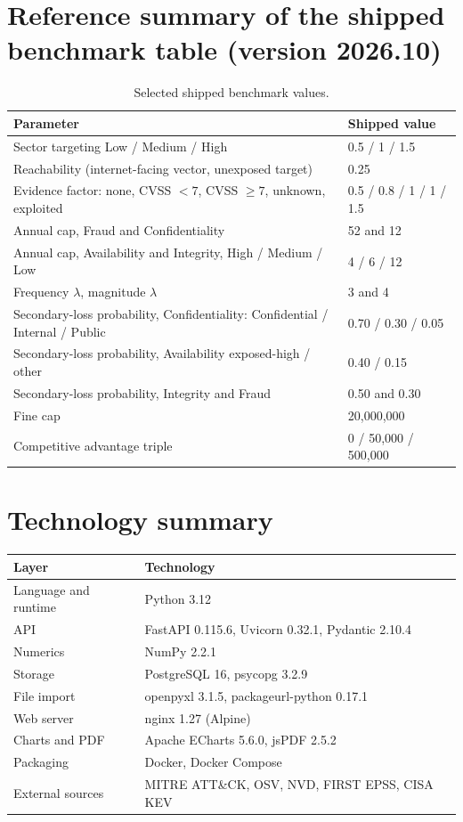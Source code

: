 \documentclass[11pt,a4paper]{article}
\begin{document}
\section{Reference summary of the shipped benchmark table (version 2026.10)}
\begin{table}[h]
\centering
\caption{Selected shipped benchmark values.}
\begin{tabularx}{\textwidth}{@{}l Y@{}}
\toprule
Parameter & Shipped value \\
\midrule
Sector targeting Low / Medium / High & 0.5 / 1 / 1.5 \\
Reachability (internet-facing vector, unexposed target) & 0.25 \\
Evidence factor: none, CVSS $<7$, CVSS $\ge7$, unknown, exploited & 0.5 / 0.8 / 1 / 1 / 1.5 \\
Annual cap, Fraud and Confidentiality & 52 and 12 \\
Annual cap, Availability and Integrity, High / Medium / Low & 4 / 6 / 12 \\
Frequency $\lambda$, magnitude $\lambda$ & 3 and 4 \\
Secondary-loss probability, Confidentiality: Confidential / Internal / Public & 0.70 / 0.30 / 0.05 \\
Secondary-loss probability, Availability exposed-high / other & 0.40 / 0.15 \\
Secondary-loss probability, Integrity and Fraud & 0.50 and 0.30 \\
Fine cap & 20,000,000 \\
Competitive advantage triple & 0 / 50,000 / 500,000 \\
\bottomrule
\end{tabularx}
\end{table}

\section{Technology summary}
\begin{center}
\begin{tabular}{@{}ll@{}}
\toprule
Layer & Technology \\
\midrule
Language and runtime & Python 3.12 \\
API & FastAPI 0.115.6, Uvicorn 0.32.1, Pydantic 2.10.4 \\
Numerics & NumPy 2.2.1 \\
Storage & PostgreSQL 16, psycopg 3.2.9 \\
File import & openpyxl 3.1.5, packageurl-python 0.17.1 \\
Web server & nginx 1.27 (Alpine) \\
Charts and PDF & Apache ECharts 5.6.0, jsPDF 2.5.2 \\
Packaging & Docker, Docker Compose \\
External sources & MITRE ATT\&CK, OSV, NVD, FIRST EPSS, CISA KEV \\
\bottomrule
\end{tabular}
\end{center}
\end{document}
